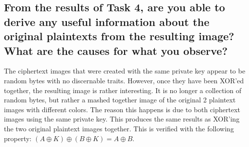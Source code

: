 \documentclass[11pt]{article}
\begin{document}
  \subsection{From the results of Task 4, are you able to derive any useful information 
  about the original plaintexts from the resulting image? What are the causes 
  for what you observe?}
  The ciphertext images that were created with the same private key appear to 
  be random bytes with no discernable traits. 
  However, once they have been XOR'ed together, the resulting image is rather
  interesting. It is no longer a collection of random bytes, but rather a 
  mashed together image of the original 2 plaintext images with different colors. 
  The reason this happens is due to both ciphertext images using the same
  private key. This produces the same results as XOR'ing the two original 
  plaintext images together. This is verified with the following property: 
  $(A \oplus K) \oplus (B \oplus K) = A \oplus B$. 
\end{document}
